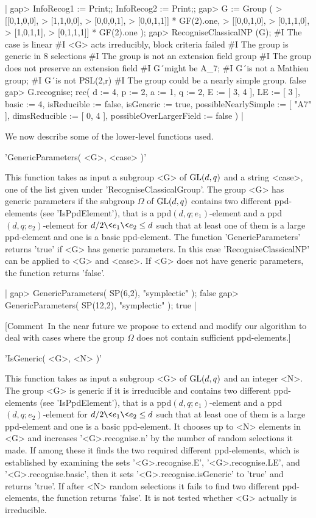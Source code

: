 |    gap> InfoRecog1 := Print;; InfoRecog2 := Print;;
    gap> G := Group (
    > [[0,1,0,0],
    >  [1,1,0,0],
    >  [0,0,0,1],
    >  [0,0,1,1]] * GF(2).one,
    > [[0,0,1,0],
    >  [0,1,1,0],
    >  [1,0,1,1],
    >  [0,1,1,1]] * GF(2).one );
    gap> RecogniseClassicalNP (G);
    #I  The case is linear
    #I  <G> acts irreducibly, block criteria failed
    #I  The group is generic in 8 selections
    #I  The group is not an extension field group
    #I  The group does not preserve an extension field
    #I  G\'\  might be A\_7;
    #I  G\'\  is not a Mathieu group;
    #I  G\'\  is not PSL(2,r)
    #I  The group could be a nearly simple group.
    false
    gap> G.recognise;
    rec(
    d := 4,
    p := 2,
    a := 1,
    q := 2,
    E := [ 3, 4 ],
    LE := [ 3 ],
    basic := 4,
    isReducible := false,
    isGeneric := true,
    possibleNearlySimple := [ "A7" ],
    dimsReducible := [ 0, 4 ],
    possibleOverLargerField := false ) |

We now describe some of the lower-level functions used.

'GenericParameters( <G>, <case> )'

This function takes as  input a subgroup <G>  of ${\rm GL}(d,q)$  and a string
<case>, one of the list given under 'RecogniseClassicalGroup'.  The group
<G>  has generic  parameters  if  the  subgroup  $\Omega$  of  ${\rm GL}(d,q)$
contains  two different ppd-elements  (see  'IsPpdElement'),  that  is  a
ppd$(d, q; e_1)$-element  and a ppd$(d, q;  e_2)$-element for $d/2 \< e_1
\< e_2 \le d$ such that at  least one of them  is a large ppd-element and
one  is  a  basic ppd-element.  The  function 'GenericParameters' returns
'true' if <G> has generic parameters. In this case 'RecogniseClassicalNP'
can  be applied to  <G>  and  <case>.   If  <G>  does  not  have  generic
parameters, the function returns 'false'.

|    gap> GenericParameters( SP(6,2), "symplectic" );
    false
    gap> GenericParameters( SP(12,2), "symplectic" );
    true |

[Comment\:\ In the near  future  we  propose  to extend and modify our
algorithm to deal with cases where the group $\Omega$ does not contain
sufficient ppd-elements.]


'IsGeneric( <G>, <N>  )'

This function  takes as input a subgroup <G> of ${\rm GL}(d,q)$ and an integer
<N>.   The  group <G> is  generic if  it is  irreducible and contains two
different  ppd-elements  (see  'IsPpdElement'),  that  is  a  ppd$(d,  q;
e_1)$-element  and a ppd$(d, q; e_2)$-element for  $d/2 \< e_1 \< e_2 \le
d$ such that at least  one  of them is a large ppd-element and one  is  a
basic  ppd-element.  It chooses  up to <N> elements  in <G> and increases
'<G>.recognise.n' by the  number of  random selections it made.  If among
these  it  finds  the  two  required  different  ppd-elements,  which  is
established by examining  the sets '<G>.recognise.E', '<G>.recognise.LE',
and  '<G>.recognise.basic',  then it  sets  '<G>.recognise.isGeneric'  to
'true'  and returns 'true'.  If after <N>  random selections it fails  to
find two different ppd-elements, the function returns 'false'.  It is not
tested whether <G> actually is irreducible.
 
